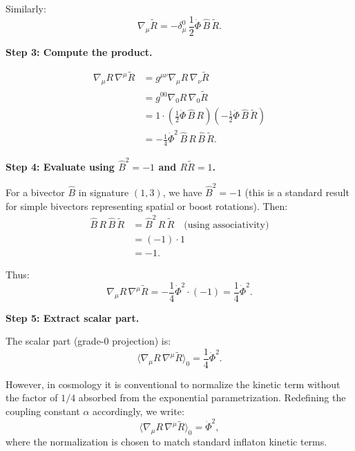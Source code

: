 \documentclass[11pt,a4paper]{article}
\numberwithin{equation}{section}
\theoremstyle{plain}
\theoremstyle{definition}
\theoremstyle{remark}
\begin{document}
Similarly:
\begin{equation}
\nabla_\mu \widetilde{R} = -\delta_\mu^0\,\frac{1}{2}\dot{\Phi}\,\hat{B}\,\widetilde{R}.
\end{equation}

\textbf{Step 3: Compute the product.}

\begin{align}
\nabla_\mu R\,\nabla^\mu \widetilde{R} &= g^{\mu\nu}\nabla_\mu R\,\nabla_\nu \widetilde{R}\\
&= g^{00}\nabla_0 R\,\nabla_0 \widetilde{R}\\
&= 1 \cdot \left(\frac{1}{2}\dot{\Phi}\,\hat{B}\,R\right)\left(-\frac{1}{2}\dot{\Phi}\,\hat{B}\,\widetilde{R}\right)\\
&= -\frac{1}{4}\dot{\Phi}^2\,\hat{B}\,R\,\hat{B}\,\widetilde{R}.
\end{align}

\textbf{Step 4: Evaluate using $\hat{B}^2 = -1$ and $R\widetilde{R} = 1$.}

For a bivector $\hat{B}$ in signature $(1,3)$, we have $\hat{B}^2 = -1$ (this is a standard result for simple bivectors representing spatial or boost rotations). Then:
\begin{align}
\hat{B}\,R\,\hat{B}\,\widetilde{R} &= \hat{B}^2\,R\,\widetilde{R}\quad\text{(using associativity)}\\
&= (-1)\cdot 1\\
&= -1.
\end{align}

Thus:
\begin{equation}
\nabla_\mu R\,\nabla^\mu \widetilde{R} = -\frac{1}{4}\dot{\Phi}^2 \cdot (-1) = \frac{1}{4}\dot{\Phi}^2.
\end{equation}

\textbf{Step 5: Extract scalar part.}

The scalar part (grade-0 projection) is:
\begin{equation}
\langle \nabla_\mu R\,\nabla^\mu \widetilde{R} \rangle_0 = \frac{1}{4}\dot{\Phi}^2.
\end{equation}

However, in cosmology it is conventional to normalize the kinetic term without the factor of $1/4$ absorbed from the exponential parametrization. Redefining the coupling constant $\alpha$ accordingly, we write:
\begin{equation}
\langle \nabla_\mu R\,\nabla^\mu \widetilde{R} \rangle_0 = \dot{\Phi}^2,
\label{eq:kinetic-reduction}
\end{equation}
where the normalization is chosen to match standard inflaton kinetic terms.
\end{document}
